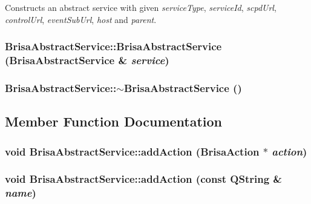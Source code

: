 Constructs an abstract service with given {\itshape serviceType\/}, {\itshape serviceId\/}, {\itshape scpdUrl\/}, {\itshape controlUrl\/}, {\itshape eventSubUrl\/}, {\itshape host\/} and {\itshape parent\/}. \hypertarget{classBrisaUpnp_1_1BrisaAbstractService_a847e71975f507b24db48ba5520c1ebf1}{
\subsubsection[{BrisaAbstractService}]{\setlength{\rightskip}{0pt plus 5cm}BrisaAbstractService::BrisaAbstractService ({\bf BrisaAbstractService} \& {\em service})}}
\label{classBrisaUpnp_1_1BrisaAbstractService_a847e71975f507b24db48ba5520c1ebf1}
\hypertarget{classBrisaUpnp_1_1BrisaAbstractService_a19434b738a7074b9a0f8b5677011fa9e}{
\subsubsection[{$\sim$BrisaAbstractService}]{\setlength{\rightskip}{0pt plus 5cm}BrisaAbstractService::$\sim$BrisaAbstractService ()}}
\label{classBrisaUpnp_1_1BrisaAbstractService_a19434b738a7074b9a0f8b5677011fa9e}


\subsection{Member Function Documentation}
\hypertarget{classBrisaUpnp_1_1BrisaAbstractService_ae4281e7bd63534372762f662c8a923d6}{
\subsubsection[{addAction}]{\setlength{\rightskip}{0pt plus 5cm}void BrisaAbstractService::addAction ({\bf BrisaAction} $\ast$ {\em action})}}
\label{classBrisaUpnp_1_1BrisaAbstractService_ae4281e7bd63534372762f662c8a923d6}
\hypertarget{classBrisaUpnp_1_1BrisaAbstractService_a628800df3aed5b953316bb8e55257ea5}{
\subsubsection[{addAction}]{\setlength{\rightskip}{0pt plus 5cm}void BrisaAbstractService::addAction (const QString \& {\em name})}}
\label{classBrisaUpnp_1_1BrisaAbstractService_a628800df3aed5b953316bb8e55257ea5}


